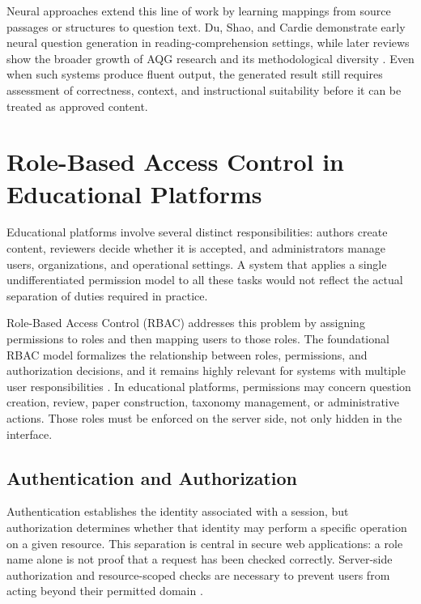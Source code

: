 Neural approaches extend this line of work by learning mappings from source passages or structures to question text. Du, Shao, and Cardie demonstrate early neural question generation in reading-comprehension settings, while later reviews show the broader growth of AQG research and its methodological diversity \cite{du2017,kurdi2020}. Even when such systems produce fluent output, the generated result still requires assessment of correctness, context, and instructional suitability before it can be treated as approved content.

\section{Role-Based Access Control in Educational Platforms}

Educational platforms involve several distinct responsibilities: authors create content, reviewers decide whether it is accepted, and administrators manage users, organizations, and operational settings. A system that applies a single undifferentiated permission model to all these tasks would not reflect the actual separation of duties required in practice.

Role-Based Access Control (RBAC) addresses this problem by assigning permissions to roles and then mapping users to those roles. The foundational RBAC model formalizes the relationship between roles, permissions, and authorization decisions, and it remains highly relevant for systems with multiple user responsibilities \cite{sandhu1996rbac}. In educational platforms, permissions may concern question creation, review, paper construction, taxonomy management, or administrative actions. Those roles must be enforced on the server side, not only hidden in the interface.

\subsection{Authentication and Authorization}

Authentication establishes the identity associated with a session, but authorization determines whether that identity may perform a specific operation on a given resource. This separation is central in secure web applications: a role name alone is not proof that a request has been checked correctly. Server-side authorization and resource-scoped checks are necessary to prevent users from acting beyond their permitted domain \cite{sandhu1996rbac,owaspAccessControl}.

